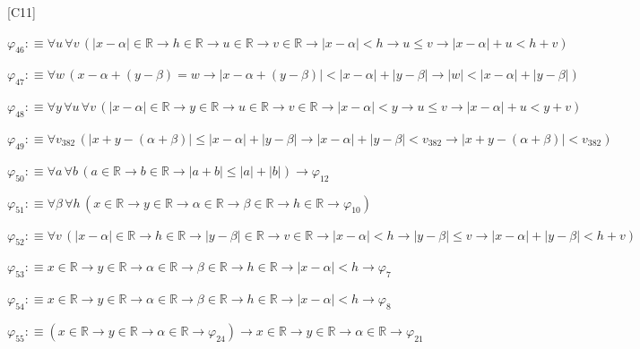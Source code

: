 \begin{fullproof}{[C11]}
\begin{abbrevlist}
\item $\varphi_{46} :\equiv \forall u\,\forall v\,(\lvert x - \alpha \rvert \in \mathbb{R} \to h \in \mathbb{R} \to u \in \mathbb{R} \to v \in \mathbb{R} \to \lvert x - \alpha \rvert < h \to u \leq v \to \lvert x - \alpha \rvert + u < h + v)$
\item $\varphi_{47} :\equiv \forall w\,(x - \alpha + (y - \beta) = w \to \lvert x - \alpha + (y - \beta) \rvert < \lvert x - \alpha \rvert + \lvert y - \beta \rvert \to \lvert w \rvert < \lvert x - \alpha \rvert + \lvert y - \beta \rvert)$
\item $\varphi_{48} :\equiv \forall y\,\forall u\,\forall v\,(\lvert x - \alpha \rvert \in \mathbb{R} \to y \in \mathbb{R} \to u \in \mathbb{R} \to v \in \mathbb{R} \to \lvert x - \alpha \rvert < y \to u \leq v \to \lvert x - \alpha \rvert + u < y + v)$
\item $\varphi_{49} :\equiv \forall v_{382}\,(\lvert x + y - (\alpha + \beta) \rvert \leq \lvert x - \alpha \rvert + \lvert y - \beta \rvert \to \lvert x - \alpha \rvert + \lvert y - \beta \rvert < v_{382} \to \lvert x + y - (\alpha + \beta) \rvert < v_{382})$
\item $\varphi_{50} :\equiv \forall a\,\forall b\,(a \in \mathbb{R} \to b \in \mathbb{R} \to \lvert a + b \rvert \leq \lvert a \rvert + \lvert b \rvert) \to \varphi_{12}$
\item $\varphi_{51} :\equiv \forall \beta\,\forall h\,(x \in \mathbb{R} \to y \in \mathbb{R} \to \alpha \in \mathbb{R} \to \beta \in \mathbb{R} \to h \in \mathbb{R} \to \varphi_{10})$
\item $\varphi_{52} :\equiv \forall v\,(\lvert x - \alpha \rvert \in \mathbb{R} \to h \in \mathbb{R} \to \lvert y - \beta \rvert \in \mathbb{R} \to v \in \mathbb{R} \to \lvert x - \alpha \rvert < h \to \lvert y - \beta \rvert \leq v \to \lvert x - \alpha \rvert + \lvert y - \beta \rvert < h + v)$
\item $\varphi_{53} :\equiv x \in \mathbb{R} \to y \in \mathbb{R} \to \alpha \in \mathbb{R} \to \beta \in \mathbb{R} \to h \in \mathbb{R} \to \lvert x - \alpha \rvert < h \to \varphi_{7}$
\item $\varphi_{54} :\equiv x \in \mathbb{R} \to y \in \mathbb{R} \to \alpha \in \mathbb{R} \to \beta \in \mathbb{R} \to h \in \mathbb{R} \to \lvert x - \alpha \rvert < h \to \varphi_{8}$
\item $\varphi_{55} :\equiv (x \in \mathbb{R} \to y \in \mathbb{R} \to \alpha \in \mathbb{R} \to \varphi_{24}) \to x \in \mathbb{R} \to y \in \mathbb{R} \to \alpha \in \mathbb{R} \to \varphi_{21}$

\end{abbrevlist}
\end{fullproof}
